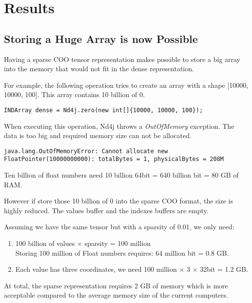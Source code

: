 \chapter{Results}

\section{Storing a Huge Array is now Possible}

Having a sparse COO tensor representation makes possible to store a big array into the memory that would not fit in the dense representation.

For example, the following operation tries to create an array with a shape [10000, 10000, 100]. This array contains 10 billion of 0.

\begin{lstlisting}[style=nonumbers]
	INDArray dense = Nd4j.zero(new int[]{10000, 10000, 100});
\end{lstlisting}

When executing this operation, Nd4j throws a \textit{OutOfMemory} exception. The data is too big and required memory size can not be allocated.
\begin{lstlisting}[style=nonumbers]
	java.lang.OutOfMemoryError: Cannot allocate new FloatPointer(10000000000): totalBytes = 1, physicalBytes = 208M
\end{lstlisting}

Ten billion of float numbers need 10 billion \time 64bit = 640 billion bit = 80 GB of RAM.

However if store those 10 billion of 0 into the sparse COO format, the size is highly reduced. The values buffer and the indexes buffers are empty. 

Assuming we have the same tensor but with a sparsity of 0.01, we only need:
\begin{enumerate}
	\item 100 billion of values $\times$ sparsity = 100 million \\
	Storing 100 million of Float numbers requires: 64 million bit = 0.8 GB.\\
	\item Each value has three coordinates, we need 100 million $\times$ 3 $\times$ 32bit = 1.2 GB.
		
\end{enumerate}
	At total, the sparse representation requires 2 GB of memory which is more acceptable compared to the average memory size of the current computers.
	
	

